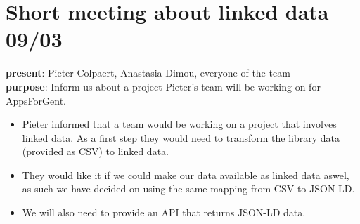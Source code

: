 \section{Short meeting about linked data 09/03}
{\bf present}: Pieter Colpaert, Anastasia Dimou, everyone of the team\\
{\bf purpose}: Inform us about a project Pieter's team will be working on for AppsForGent.
\begin{itemize}
  \item Pieter informed that a team would be working on a project that involves linked data. As a first step they would need to transform the library data (provided as CSV) to linked data.
  \item They would like it if we could make our data available as linked data aswel, as such we have decided on using the same mapping from CSV to JSON-LD.
  \item We will also need to provide an API that returns JSON-LD data.
\end{itemize}